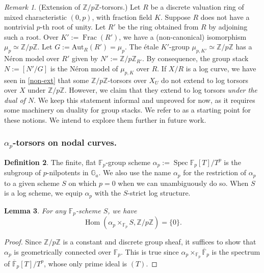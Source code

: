 \documentclass[a4paper,11pt]{amsart} %
\numberwithin{equation}{subsection}
\newcommand{\on}[1]{\operatorname{#1}}
\newcommand{\bb}[1]{{\mathbb{#1}}}
\def\o#1{\overline{#1}}
\newcommand{\Spec}{\operatorname{Spec}}
\theoremstyle{definition}
\newtheorem{definition}{Definition}[section]
\theoremstyle{plain}%
\newtheorem{lemma}[definition]{Lemma}
\theoremstyle{remark}
\newtheorem{remark}[definition]{Remark}
\begin{document}
\begin{remark}\label{Group stack}
   (Extension of $\mathbb{Z}/p\mathbb{Z}$-torsors.) Let $R$ be a discrete valuation ring of mixed characteristic $(0,p)$, with fraction field $K$. Suppose $R$ does not have a nontrivial $p$-th root of unity. Let $R'$ be the ring obtained from $R$ by adjoining such a root. Over $K':=\on{Frac}(R')$, we have a (non-canonical) isomorphism $\mu_p\simeq \mathbb{Z}/ p\mathbb{Z}$. Let $G:=\mathrm{Aut}_R(R')=\mu_p$. The \'etale $K'$-group $\mu_{p,K'} \simeq \mathbb{Z}/p\mathbb{Z}$ has a Néron model over $R'$ given by $N':=\mathbb{Z}/p\mathbb{Z}_{R'}$. By consequence, the group stack $N:=[N'/G]$ is the N\'eron model of $\mu_{p,K}$ over $R$. If $X/R$ is a log curve, we have seen in \ref{non-ext} that some $\mathbb{Z}/p\mathbb{Z}$-torsors over $X_U$ do not extend to log torsors over $X$ under $\bb Z/p\bb Z$. However, we claim that they extend to log torsors \emph{under the dual of $N$}. We keep this statement informal and unproved for now, as it requires some machinery on duality for group stacks. We refer to \cite{SBr} as a starting point for these notions. We intend to explore them further in future work.
\end{remark}



\subsubsection{$\alpha_p$-torsors on nodal curves.}\label{alpha_p-torsors}

\begin{definition}
    The finite, flat $\bb F_p$-group scheme $\alpha_p:=\Spec \bb F_p[T]/T^p$ is the subgroup of $p$-nilpotents in $\bb G_a$. We also use the name $\alpha_p$ for the restriction of $\alpha_p$ to a given scheme $S$ on which $p=0$ when we can unambiguously do so. When $S$ is a log scheme, we equip $\alpha_p$ with the $S$-strict log structure.
\end{definition}

\begin{lemma}\label{lemma:morphisms_alpha_p_to_Z/pZ_are_trivial}
    For any $\bb F_p$-scheme $S$, we have
    \[
    \on{Hom}(\alpha_p\times_{\bb F_p} S,\bb Z/p\bb Z)=\{0\}.
    \]
\end{lemma}

\begin{proof}
    Since $\bb Z/p\bb Z$ is a constant and discrete group sheaf, it suffices to show that $\alpha_p$ is geometrically connected over $\bb F_p$. This is true since $\alpha_p\times_{\bb F_p} \o{\bb F}_p$ is the spectrum of $\o{\bb F}_p[T]/T^p$, whose only prime ideal is $(T)$.
\end{proof}
\end{document}
